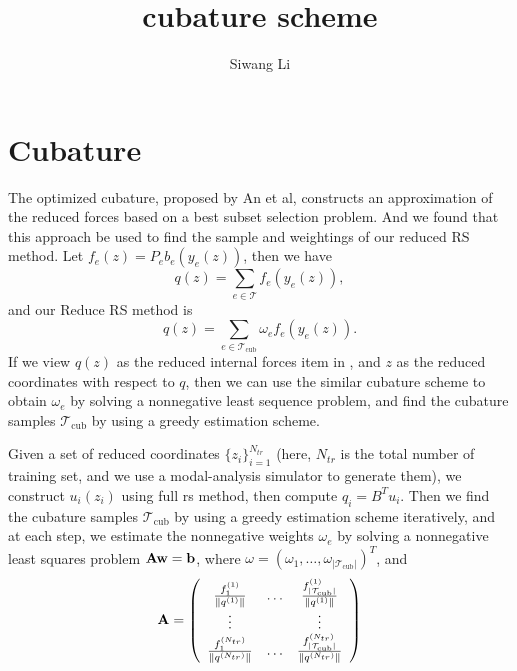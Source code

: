 \documentclass[9pt,twocolumn]{extarticle}
\author{Siwang Li}
\title{cubature scheme}
\begin{document}
\maketitle

\setlength{\parskip}{0.5ex}

\section{Cubature}
The optimized cubature, proposed by An et al\cite{cubature2008}, constructs an
approximation of the reduced forces based on a best subset selection
problem. And we found that this approach be used to find the sample and
weightings of our reduced RS method. Let $f_e(z) = P_eb_e(y_e(z))$, then we have
\begin{equation} \label{reduced_rs6}
  q(z) = \sum_{e\in\mathcal{T}}f_e(y_e(z)),
\end{equation}
and our Reduce RS method is
\begin{equation} \label{reduced_rs7}
  q(z) = \sum_{e\in\mathcal{T}_{\text{cub}}}\!\!\omega_e f_e(y_e(z)).
\end{equation}
If we view $q(z)$ as the reduced internal forces item in \cite{cubature2008},
and $z$ as the reduced coordinates with respect to $q$, then we can use the
similar cubature scheme to obtain $\omega_e$ by solving a nonnegative least
sequence problem, and find the cubature samples $\mathcal{T}_{\text{cub}}$ by
using a greedy estimation scheme.

Given a set of reduced coordinates $\{z_i\}_{i=1}^{N_{tr}}$ (here, $N_{tr}$ is
the total number of training set, and we use a modal-analysis simulator
\cite{ma} to generate them), we construct $u_i(z_i)$ using full rs method, then
compute $q_i=B^Tu_i$. Then we find the cubature samples
$\mathcal{T}_{\text{cub}}$ by using a greedy estimation scheme iteratively, and
at each step, we estimate the nonnegative weights $\omega_e$ by solving a
nonnegative least squares problem $\bold{A}\bold{w}=\bold{b}$, where
$\omega=(\omega_1,\hdots,\omega_{|\mathcal{T}_{\text{cub}}|})^T$, and
\begin{equation} \label{nls}
  \bold{A} = \left( \begin{array}{ccccc}
      \frac{f_1^{(1)}}{\|q^{(1)}\|}&\hdots&\frac{f_{|\mathcal{T}_{\text{cub}}|}^{(1)}}{\|q^{(1)}\|}\\
      \vdots &&\vdots\\
      \frac{f_{1}^{(N_{tr})}}{\|q^{(N_{tr})}\|}&\hdots&\frac{f_{|\mathcal{T}_{\text{cub}}|}^{(N_{tr})}}{\|q^{(N_{tr})}\|}
    \end{array} \right)
\end{equation}
\end{document}
